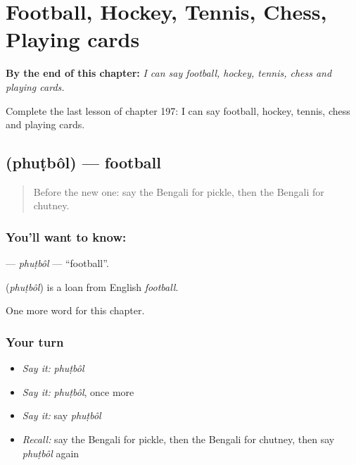 
\chapter{Football, Hockey, Tennis, Chess, Playing cards}
\label{ch:bn-football-hockey-tennis-chess-playing-cards}

\begin{chapteropening}
\textbf{By the end of this chapter:} \emph{I can say football, hockey, tennis, chess and playing cards.}

Complete the last lesson of chapter 197: I can say football, hockey, tennis, chess and playing cards.
\end{chapteropening}

\section[\texorpdfstring{\bn{ফুটবল} (phuṭbôl)}{ফুটবল (phuṭbôl)}]{ (phuṭbôl) — football}

\label{lesson:BN-C197-phutbol}



\begin{quote}
Before the new one: say the Bengali for pickle, then the Bengali for chutney.
\end{quote}

\subsection*{You'll want to know: }
\textbf{} — \emph{phuṭbôl} — \textquotedblleft{}football\textquotedblright{}.

\begin{cousinweb}
\textbf{} (\emph{phuṭbôl}) is a loan from English \emph{football}.
\end{cousinweb}

\begin{grammarlens}[title={What you've built}]
One more word for this chapter.
\end{grammarlens}

\subsection*{Your turn}
\begin{itemize}
\raggedright
  \item \emph{Say it:} \emph{phuṭbôl}
  \item \emph{Say it:} \emph{phuṭbôl}, once more
  \item \emph{Say it:} say \emph{phuṭbôl}
  \item \emph{Recall:} say the Bengali for pickle, then the Bengali for chutney, then say \emph{phuṭbôl} again
\end{itemize}

